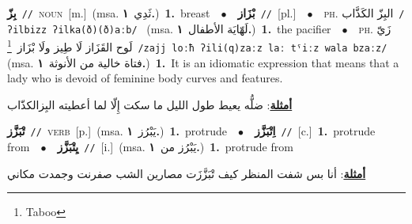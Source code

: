 \documentclass[10pt,a4paper,twoside]{article} %
\begin{document}
\begin{multicols}{2}
{\setlength\topsep{0pt}\textbf{\foreignlanguage{arabic}{بِزّ}}\ {\color{gray}\texttt{//}\color{black}}\ \textsc{noun}\ [m.]\ \color{gray}(msa. \foreignlanguage{arabic}{ثَدِي}~\foreignlanguage{arabic}{\textbf{١.}})\color{black}\ \textbf{1.}~breast\ \ $\bullet$\ \ \setlength\topsep{0pt}\textbf{\foreignlanguage{arabic}{بْزَاز}}\ {\color{gray}\texttt{//}\color{black}}\ [pl.]\ \ $\bullet$\ \ \textsc{ph.} \color{gray} \foreignlanguage{arabic}{البِزّ الكَذَّاب}\color{black}\ {\color{gray}\texttt{/{\sffamily ʔilbizz ʔilka(ð)(ð)aːb}/}\color{black}}\ \color{gray} (msa. \foreignlanguage{arabic}{لَهّايَة الأطفال}~\foreignlanguage{arabic}{\textbf{١.}})\color{black}\ \textbf{1.}~the pacifier\ \ $\bullet$\ \ \textsc{ph.} \color{gray} \foreignlanguage{arabic}{زَيّ لَوح القَزَاز لَا طِيز ولَا بْزَاز}\color{black}\ \footnote{Taboo}\ {\color{gray}\texttt{/{\sffamily zajj loːħ ʔili(q)zaːz laː tˤiːz wala bzaːz}/}\color{black}}\ \color{gray} (msa. \foreignlanguage{arabic}{فتاة خالية من الأنوثة}~\foreignlanguage{arabic}{\textbf{١.}})\color{black}\ \textbf{1.}~It is an idiomatic expression that means that a lady who is devoid of feminine body curves and features.\  \begin{flushright}\color{gray}\foreignlanguage{arabic}{\textbf{\underline{\foreignlanguage{arabic}{أمثلة}}}: ضلُّه يعيط طول الليل ما سكت إِلّا لما أعطيته البِزالكذّاب}\end{flushright}\color{black}} \vspace{2mm}

{\setlength\topsep{0pt}\textbf{\foreignlanguage{arabic}{تْبَزَّز}}\ {\color{gray}\texttt{//}\color{black}}\ \textsc{verb}\ [p.]\ \color{gray}(msa. \foreignlanguage{arabic}{يَبْرُز}~\foreignlanguage{arabic}{\textbf{١.}})\color{black}\ \textbf{1.}~protrude\ \ $\bullet$\ \ \setlength\topsep{0pt}\textbf{\foreignlanguage{arabic}{اِتْبَزَّز}}\ {\color{gray}\texttt{//}\color{black}}\ [c.]\ \textbf{1.}~protrude from\ \ $\bullet$\ \ \setlength\topsep{0pt}\textbf{\foreignlanguage{arabic}{يِتْبَزَّز}}\ {\color{gray}\texttt{//}\color{black}}\ [i.]\ \color{gray}(msa. \foreignlanguage{arabic}{يَبْرُز من}~\foreignlanguage{arabic}{\textbf{١.}})\color{black}\ \textbf{1.}~protrude from\  \begin{flushright}\color{gray}\foreignlanguage{arabic}{\textbf{\underline{\foreignlanguage{arabic}{أمثلة}}}: أنا بس شفت المنظر كيف تْبَزَّزَت مصارين الشب صفرنت وجمدت مكاني}\end{flushright}\color{black}} \vspace{2mm}


\end{multicols}
\end{document}
